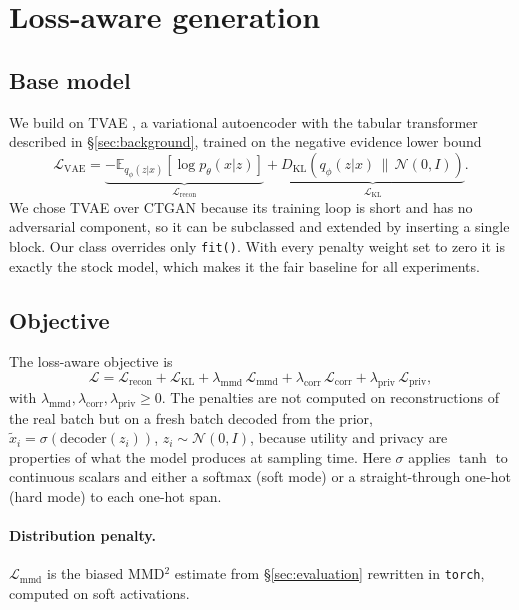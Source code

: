 \documentclass[11pt,a4paper]{article}
\newcommand{\Lrec}{\mathcal{L}_{\text{recon}}}
\newcommand{\Lkl}{\mathcal{L}_{\text{KL}}}
\newcommand{\Lmmd}{\mathcal{L}_{\text{mmd}}}
\newcommand{\Lcorr}{\mathcal{L}_{\text{corr}}}
\newcommand{\Lpriv}{\mathcal{L}_{\text{priv}}}
\newcommand{\lmmd}{\lambda_{\text{mmd}}}
\newcommand{\lcorr}{\lambda_{\text{corr}}}
\newcommand{\lpriv}{\lambda_{\text{priv}}}
\begin{document}
\section{Loss-aware generation}
\label{sec:lossaware}

\subsection{Base model}

We build on TVAE \citep{xu2019ctgan}, a variational autoencoder
\citep{kingma2014vae} with the tabular transformer described in
\S\ref{sec:background}, trained on the negative evidence lower bound
\begin{equation}
\mathcal{L}_{\text{VAE}} =
\underbrace{-\mathbb{E}_{q_\phi(z|x)}\!\left[\log p_\theta(x|z)\right]}_{\Lrec}
+ \underbrace{D_{\mathrm{KL}}\!\left(q_\phi(z|x)\,\|\,\mathcal{N}(0,I)\right)}_{\Lkl}.
\end{equation}
We chose TVAE over CTGAN because its training loop is short and has no
adversarial component, so it can be subclassed and extended by inserting a
single block. Our class overrides only \texttt{fit()}. With every penalty
weight set to zero it is exactly the stock model, which makes it the fair
baseline for all experiments.

\subsection{Objective}

The loss-aware objective is
\begin{equation}
\mathcal{L} = \Lrec + \Lkl + \lmmd\,\Lmmd + \lcorr\,\Lcorr + \lpriv\,\Lpriv ,
\label{eq:objective}
\end{equation}
with $\lmmd,\lcorr,\lpriv \ge 0$. The penalties are not computed on
reconstructions of the real batch but on a fresh batch decoded from the prior,
$\tilde{x}_i = \sigma(\text{decoder}(z_i))$, $z_i \sim \mathcal{N}(0,I)$,
because utility and privacy are properties of what the model produces at
sampling time. Here $\sigma$ applies $\tanh$ to continuous scalars and either
a softmax (soft mode) or a straight-through one-hot (hard mode) to each one-hot
span.

\paragraph{Distribution penalty.}
$\Lmmd$ is the biased MMD$^2$ estimate from \S\ref{sec:evaluation} rewritten
in \texttt{torch}, computed on soft activations.
\end{document}
